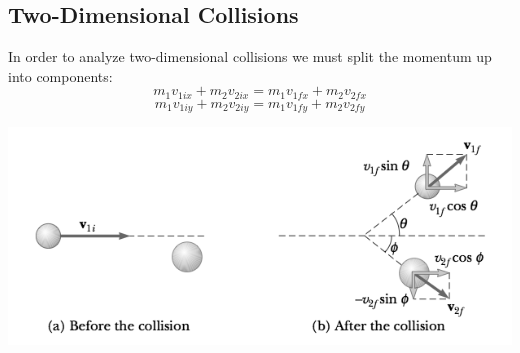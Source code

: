 \documentclass{article}
\begin{document}
	\subsection{Two-Dimensional Collisions}
    	In order to analyze two-dimensional collisions we must split the momentum up into components:
        \[
        	m_1v_{1ix}+m_2v_{2ix}=m_1v_{1fx}+m_2v_{2fx}
        \]
        \[
        	m_1v_{1iy}+m_2v_{2iy}=m_1v_{1fy}+m_2v_{2fy}
        \]
        \centerline{\includegraphics[width=15cm]{collisionP.png}}
        
\end{document}
